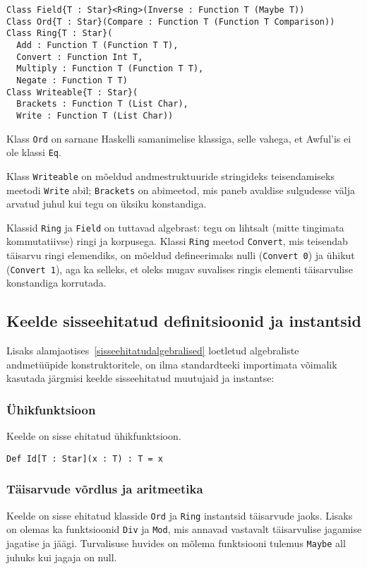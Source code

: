 \documentclass[12pt]{article}
\begin{document}
        \begin{verbatim}Class Field{T : Star}<Ring>(Inverse : Function T (Maybe T))
Class Ord{T : Star}(Compare : Function T (Function T Comparison))
Class Ring{T : Star}(
  Add : Function T (Function T T),
  Convert : Function Int T,
  Multiply : Function T (Function T T),
  Negate : Function T T)
Class Writeable{T : Star}(
  Brackets : Function T (List Char),
  Write : Function T (List Char))\end{verbatim}

        Klass \verb!Ord! on sarnane Haskelli samanimelise klassiga, selle vahega, et Awful'is ei ole klassi \verb!Eq!.

        Klass \verb!Writeable! on mõeldud andmestruktuuride stringideks teisendamiseks meetodi \verb!Write! abil; \verb!Brackets! on abimeetod, mis paneb avaldise sulgudesse välja arvatud juhul kui tegu on üksiku konstandiga.

        Klassid \verb!Ring! ja \verb!Field! on tuttavad algebrast: tegu on lihtsalt (mitte tingimata kommutatiivse) ringi ja korpusega. Klassi \verb!Ring! meetod \verb!Convert!, mis teisendab täisarvu ringi elemendiks, on mõeldud defineerimaks nulli (\verb!Convert 0!) ja ühikut (\verb!Convert 1!), aga ka selleks, et oleks mugav suvalises ringis elementi täisarvulise konstandiga korrutada.
    \subsection{Keelde sisseehitatud definitsioonid ja instantsid}
      Lisaks alamjaotises~\ref{sisseehitatudalgebralised} loetletud algebraliste andmetüüpide konstruktoritele, on ilma standardteeki importimata võimalik kasutada järgmisi keelde sisseehitatud muutujaid ja instantse:
      \subsubsection{Ühikfunktsioon}
        Keelde on sisse ehitatud ühikfunktsioon.

        \begin{verbatim}Def Id[T : Star](x : T) : T = x\end{verbatim}
      \subsubsection{Täisarvude võrdlus ja aritmeetika}
        Keelde on sisse ehitatud klasside \verb!Ord! ja \verb!Ring! instantsid täisarvude jaoks. Lisaks on olemas ka funktsioonid \verb!Div! ja \verb!Mod!, mis annavad vastavalt täisarvulise jagamise jagatise ja jäägi. Turvalisuse huvides on mõlema funktsiooni tulemus \verb!Maybe! all juhuks kui jagaja on null.
\end{document}
